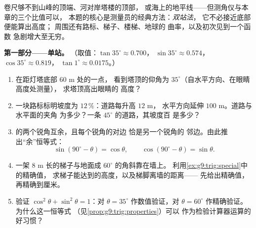 \begin{problem}
\label{pb:g9:trig:1}
卷尺够不到山峰的顶端、河对岸塔楼的顶部，
或海上的地平线——但测角仪与本章的三个比值可以，
本题的核心是测量员的经典方法：\emph{双站法}，
它不必接近底部便能算出高度；
周围还有路标、梯子、楼梯、地球的
曲率，以及初次见到一个函数
急剧增大至无穷。

\medskip
\noindent\textbf{第一部分——单站。}
（取值：$\tan 35^\circ \approx 0.700$，
$\sin 35^\circ \approx 0.574$，$\cos 35^\circ \approx 0.819$，
$\tan 1^\circ \approx 0.0175$。）
\begin{enumerate}
  \item 在距灯塔底部 $60$ m 处的一点，
        看到塔顶的仰角为 $35^\circ$（自水平方向、在眼睛高度处测量），
        求塔顶高出眼睛的
        高度？
  \item 一块路标标明坡度为 $12\,\%$：道路每升高 $12$ m，
        水平方向延伸 $100$ m。道路与水平面的夹角
        为多少？一条 $45^\circ$ 的道路，其坡度百
        是多少？
  \item {}的两个锐角互余，且每个锐角的对边
        恰是另一个锐角的
        邻边。由此推出“余”恒等式：
        \[
        \sin(90^\circ - \theta) = \cos\theta,
        \qquad
        \cos(90^\circ - \theta) = \sin\theta .
        \]
  \item 一架 $8$ m 长的梯子与地面成 $60^\circ$ 的角斜靠在墙上。
        利用\cref{ex:g9:trig:special}中的精确值，
        求梯子能达到的高度，以及梯脚离墙的距离——
        先给出精确值，再精确到厘米。
  \item 验证 $\cos^2\theta + \sin^2\theta = 1$：对 $\theta = 35^\circ$
        作数值验证，对 $\theta = 60^\circ$ 作精确验证。
        为什么这一恒等式
        （见\cref{prop:g9:trig:properties}）可以
        作为检验计算器运算的好习惯？
\end{enumerate}


\end{problem}
